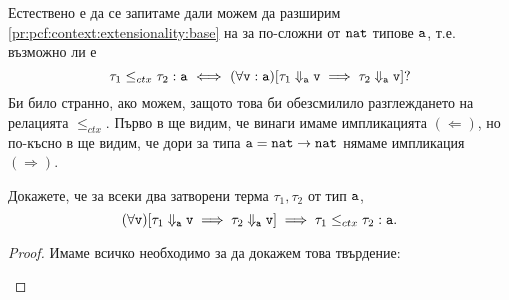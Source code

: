 Естествено е да се запитаме дали можем да разширим \ref{pr:pcf:context:extensionality:base} на  за по-сложни от $\nat$ типове $\vv{a}$, т.е. възможно ли е
\[\tau_1 \leq_{ctx} \tau_2 : \vv{a} \iff (\forall \vv{v} : \vv{a})[\tau_1 \Downarrow_{\vv{a}} \vv{v} \implies \tau_2 \Downarrow_{\vv{a}} \vv{v}]?\]
Би било странно, ако можем, защото това би обезсмилило разглеждането на релацията $\leq_{ctx}$.
Първо в  ще видим, че винаги имаме импликацията $(\Leftarrow)$, но по-късно в  ще видим, че дори за типа $\vv{a} = \nat\to\nat$ нямаме импликация $(\Rightarrow)$.

\begin{proposition}\label{pr:context:op-left-right}
  Докажете, че за всеки два затворени терма $\tau_1, \tau_2$ от тип $\vv{a}$,
  \[(\forall \vv{v})[\tau_1 \Downarrow_{\vv{a}} \vv{v} \implies \tau_2 \Downarrow_{\vv{a}} \vv{v} ] \implies \tau_1 \leq_{ctx} \tau_2 : \vv{a}.\]
\end{proposition}
\begin{proof}
  Имаме всичко необходимо за да докажем това твърдение:
  \begin{prooftree}
  \end{prooftree}
\end{proof}

